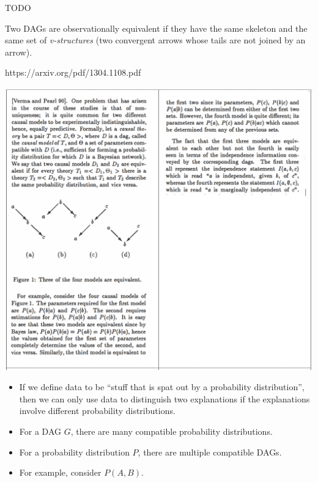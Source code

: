 \begin{definition}
  TODO
\end{definition}

\begin{theorem}
  Two DAGs are observationally equivalent if they have the same skeleton and the same set of {\it v-structures} (two
  convergent arrows whose tails are not joined by an arrow).
\end{theorem}

https://arxiv.org/pdf/1304.1108.pdf

\includegraphics[width=400pt]{img/statistics-and-machine-learning--pearl--conditional-independence-and-graphoids-39eb.png}


\begin{intuition}
  \begin{itemize}
  \item If we define data to be ``stuff that is spat out by a probability distribution'', then we can only use data
    to distinguish two explanations if the explanations involve different probability distributions.
  \item For a DAG $G$, there are many compatible probability distributions.
  \item For a probability distribution $P$, there are multiple compatible DAGs.
  \item For example, consider $P(A, B)$.
  \end{itemize}
\end{intuition}

